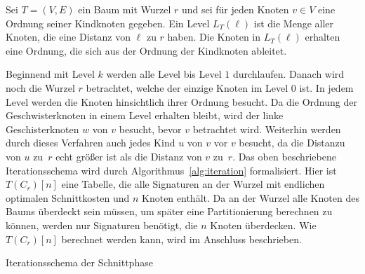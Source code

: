 \begin{defn}[Level]\label{def:level}
    Sei $T = (V,E)$ ein Baum mit Wurzel $r$ und sei für jeden Knoten $v \in V$ eine Ordnung seiner Kindknoten gegeben.
    Ein Level $L_T(\ell)$ ist die Menge aller Knoten, die eine Distanz von $\ell$ zu $r$ haben.
    Die Knoten in $L_T(\ell)$ erhalten eine Ordnung, die sich aus der Ordnung der Kindknoten ableitet.
\end{defn}

Beginnend mit Level $k$ werden alle Level bis Level $1$ durchlaufen.
Danach wird noch die Wurzel $r$ betrachtet, welche der einzige Knoten im Level $0$ ist. 
In jedem Level werden die Knoten hinsichtlich ihrer Ordnung besucht.
Da die Ordnung der Geschwisterknoten in einem Level erhalten bleibt, wird der linke Geschisterknoten $w$ von $v$ besucht, bevor $v$ betrachtet wird.
Weiterhin werden durch dieses Verfahren auch jedes Kind $u$ von $v$ vor $v$ besucht, da die Distanzu von $u$ zu~$r$ echt größer ist als die Distanz von $v$ zu~$r$.
Das oben beschriebene Iterationsschema wird durch Algorithmus~\ref{alg:iteration} formalisiert.
Hier ist $T(C_r)[n]$ eine Tabelle, die alle Signaturen an der Wurzel mit endlichen optimalen Schnittkosten und $n$ Knoten enthält.
Da an der Wurzel alle Knoten des Baums überdeckt sein müssen, um später eine Partitionierung berechnen zu können, werden nur Signaturen benötigt, die $n$ Knoten überdecken.
Wie $T(C_r)[n]$ berechnet werden kann, wird im Anschluss beschrieben.

\begin{algorithm}
    \caption{Iterationsschema der Schnittphase}\label{alg:iteration}
    \begin{algorithmic}[1]
             
                 
                    \State {}
                \EndFor
            \EndFor
             
                \State {}
            \EndFor
             
        \EndFunction
    \end{algorithmic}
\end{algorithm}

\newcommand{\canfun}{\textproc{cut\_at\_node}}
\newcommand{\carfun}{\textproc{cut\_at\_root}}

